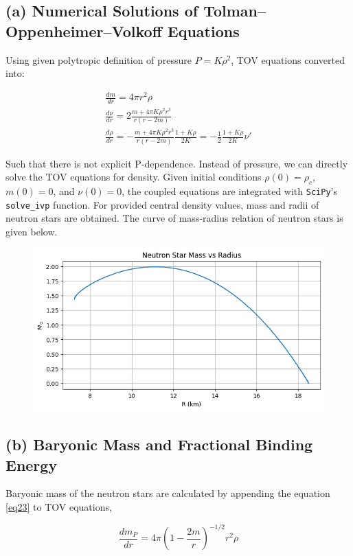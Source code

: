 \documentclass[aps,twocolumn,showpacs,preprintnumbers,nofootinbib,prl,superscriptaddress,groupedaddress]{revtex4-2}
\begin{document}
\subsection{(a) Numerical Solutions of Tolman–Oppenheimer–Volkoff Equations}

Using given polytropic definition of pressure $P = K\rho^2$, TOV equations converted into:

\begin{align}
		&\frac{dm}{dr} = 4\pi r^2\rho   & \\
	&\frac{d\nu}{dr} = 2\frac{m+4\pi K\rho^2r^3}{r(r-2m)}  &  \\
	&\frac{d\rho}{dr} = -\frac{m+4\pi K\rho^2 r^3}{r(r-2m)}\frac{1+K\rho}{2K} = -\frac{1}{2}\frac{1+K\rho}{2K}\nu'  &
\end{align}

Such that there is not explicit P-dependence. Instead of pressure, we can directly solve the TOV equations for density. Given initial conditions $\rho(0)=\rho_c$, $m(0)=0$, and $\nu(0)=0$, the coupled equations are integrated with \texttt{SciPy}'s \texttt{solve\_ivp} function. For provided central density values, mass and radii of neutron stars are obtained. The curve of mass-radius relation of neutron stars is given below.

\begin{figure}[!htb]
	\centering
	\includegraphics[width=0.5\linewidth]{Plots/einstein-part-a}
	\caption{}
	\label{fig:einstein-part-a}
\end{figure}

\subsection{(b) Baryonic Mass and Fractional Binding Energy}

Baryonic mass of the neutron stars are calculated by appending the equation \ref{eq23} to TOV equations,

\begin{equation}\label{eq23}
	\frac{dm_P}{dr} = 4\pi (1-\frac{2m}{r})^{-1/2}r^2\rho
\end{equation}
\end{document}
